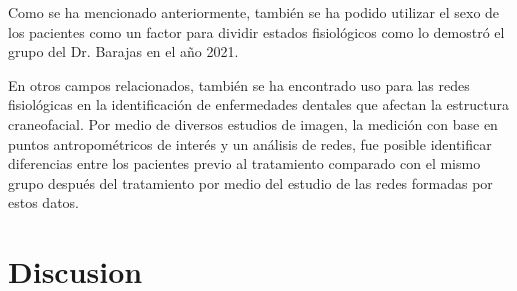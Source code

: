 \documentclass[twoside,twocolumn]{article}
\begin{document}
Como se ha mencionado anteriormente, también se ha podido utilizar el sexo de los pacientes como un factor para dividir estados fisiológicos como lo demostró el grupo del Dr. Barajas en el año 2021\cite{barajas2021sex}.

En otros campos relacionados, también se ha encontrado uso para las redes fisiológicas en la identificación de enfermedades dentales que afectan la estructura craneofacial\cites{scala2014complex}.
Por medio de diversos estudios de imagen, la medición con base en puntos antropométricos de interés y un análisis de redes, fue posible identificar diferencias entre los pacientes previo al tratamiento comparado con el mismo grupo después del tratamiento por medio del estudio de las redes formadas por estos datos.

\section{Discusion}
\end{document}
